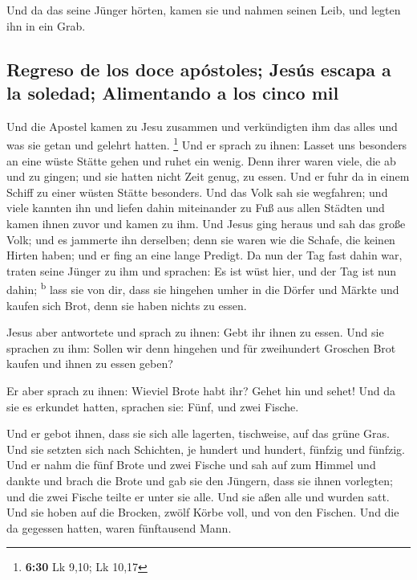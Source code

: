  Und da das seine Jünger hörten, kamen sie und nahmen
seinen Leib, und legten ihn in ein Grab.

\hypertarget{regreso-de-los-doce-apuxf3stoles-jesuxfas-escapa-a-la-soledad-alimentando-a-los-cinco-mil}{%
\subsection{Regreso de los doce apóstoles; Jesús escapa a la soledad;
Alimentando a los cinco
mil}\label{regreso-de-los-doce-apuxf3stoles-jesuxfas-escapa-a-la-soledad-alimentando-a-los-cinco-mil}}

 Und die Apostel kamen zu Jesu zusammen und verkündigten
ihm das alles und was sie getan und gelehrt hatten. \footnote{\textbf{6:30}
  Lk 9,10; Lk 10,17}  Und er sprach zu ihnen: Lasset uns
besonders an eine wüste Stätte gehen und ruhet ein wenig. Denn ihrer
waren viele, die ab und zu gingen; und sie hatten nicht Zeit genug, zu
essen.  Und er fuhr da in einem Schiff zu einer wüsten
Stätte besonders.  Und das Volk sah sie wegfahren; und
viele kannten ihn und liefen dahin miteinander zu Fuß aus allen Städten
und kamen ihnen zuvor und kamen zu ihm.  Und Jesus ging
heraus und sah das große Volk; und es jammerte ihn derselben; denn sie
waren wie die Schafe, die keinen Hirten haben; und er fing an eine lange
Predigt.  Da nun der Tag fast dahin war, traten seine
Jünger zu ihm und sprachen: Es ist wüst hier, und der Tag ist nun dahin;
\textsuperscript{b}  lass sie von dir, dass sie hingehen
umher in die Dörfer und Märkte und kaufen sich Brot, denn sie haben
nichts zu essen.

 Jesus aber antwortete und sprach zu ihnen: Gebt ihr
ihnen zu essen. Und sie sprachen zu ihm: Sollen wir denn hingehen und
für zweihundert Groschen Brot kaufen und ihnen zu essen geben?

 Er aber sprach zu ihnen: Wieviel Brote habt ihr? Gehet
hin und sehet! Und da sie es erkundet hatten, sprachen sie: Fünf, und
zwei Fische.

 Und er gebot ihnen, dass sie sich alle lagerten,
tischweise, auf das grüne Gras.  Und sie setzten sich
nach Schichten, je hundert und hundert, fünfzig und fünfzig.
 Und er nahm die fünf Brote und zwei Fische und sah auf
zum Himmel und dankte und brach die Brote und gab sie den Jüngern, dass
sie ihnen vorlegten; und die zwei Fische teilte er unter sie alle.
 Und sie aßen alle und wurden satt.  Und
sie hoben auf die Brocken, zwölf Körbe voll, und von den Fischen.
 Und die da gegessen hatten, waren fünftausend Mann.

